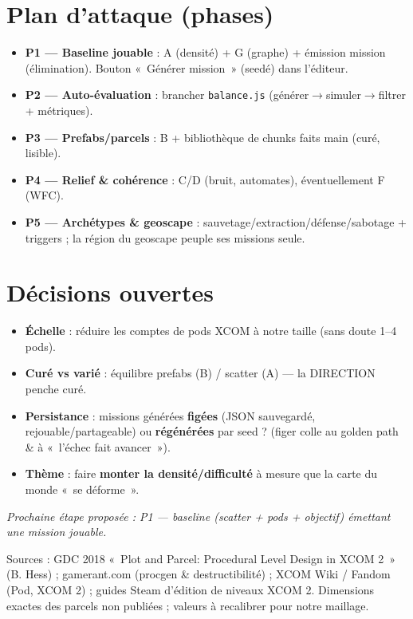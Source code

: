 \documentclass[11pt,a4paper]{article}
\begin{document}
\section{Plan d'attaque (phases)}
\begin{itemize}
\item \textbf{P1 --- Baseline jouable} : A (densité) + G (graphe) + émission mission (élimination). Bouton «~Générer mission~» (seedé) dans l'éditeur.
\item \textbf{P2 --- Auto-évaluation} : brancher \texttt{balance.js} (générer$\to$simuler$\to$filtrer + métriques).
\item \textbf{P3 --- Prefabs/parcels} : B + bibliothèque de chunks faits main (curé, lisible).
\item \textbf{P4 --- Relief \& cohérence} : C/D (bruit, automates), éventuellement F (WFC).
\item \textbf{P5 --- Archétypes \& geoscape} : sauvetage/extraction/défense/sabotage + triggers ; la région du geoscape peuple ses missions seule.
\end{itemize}

\section{Décisions ouvertes}
\begin{openbox}
\begin{itemize}
\item \textbf{Échelle} : réduire les comptes de pods XCOM à notre taille (sans doute 1--4 pods).
\item \textbf{Curé vs varié} : équilibre prefabs (B) / scatter (A) --- la DIRECTION penche curé.
\item \textbf{Persistance} : missions générées \textbf{figées} (JSON sauvegardé, rejouable/partageable) ou \textbf{régénérées} par seed ? (figer colle au golden path \& à «~l'échec fait avancer~»).
\item \textbf{Thème} : faire \textbf{monter la densité/difficulté} à mesure que la carte du monde «~se déforme~».
\end{itemize}
\end{openbox}

\begin{center}\itshape Prochaine étape proposée : P1 --- baseline (scatter + pods + objectif) émettant une mission jouable.\end{center}

\vfill\footnotesize\textcolor{ink!70}{Sources : GDC 2018 «~Plot and Parcel: Procedural Level Design in XCOM 2~» (B. Hess) ; gamerant.com (procgen \& destructibilité) ; XCOM Wiki / Fandom (Pod, XCOM 2) ; guides Steam d'édition de niveaux XCOM 2. Dimensions exactes des parcels non publiées ; valeurs à recalibrer pour notre maillage.}
\end{document}
